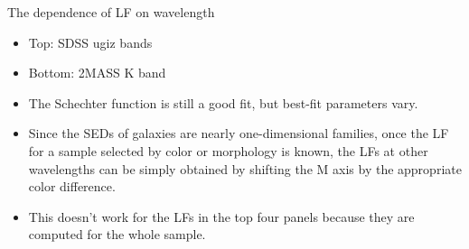 \documentclass[letterpaper,landscape]{slides}
\begin{document}
\begin{slide}
{\begin{minipage}[t]{15cm}
\begin{center}
{\large \color{red} The dependence of LF on wavelength}
\end{center}

\begin{itemize}
\item
Top: SDSS ugiz bands
\item
Bottom: 2MASS K band
\item
{\color{blue} The Schechter function is still a good fit, but best-fit parameters vary.} 
\item 
Since the SEDs of galaxies are nearly one-dimensional families,
once the LF for a sample selected by color or morphology is 
known, the LFs at other wavelengths can be simply obtained
by shifting the M axis by the appropriate color difference. 
\item
This doesn't work for the LFs in the top four panels because 
they are computed for the whole sample.
\end{itemize}  

\end{minipage}}
\vfill 
\end{slide}
\end{document}
